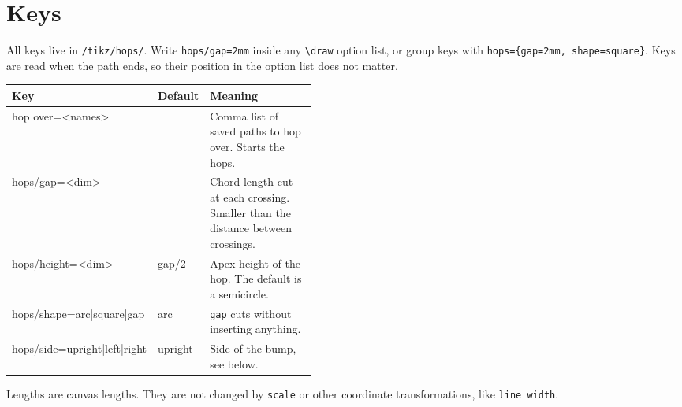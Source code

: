 \documentclass[a4paper]{article}
\newcommand\key[1]{\texttt{#1}}
\newenvironment{example}
  {\VerbatimOut{\jobname.ex}}
  {\endVerbatimOut\par\medskip\noindent
   \VerbatimInput[frame=single,fontsize=\small]{\jobname.ex}\par\smallskip
   \noindent\par\medskip}
\begin{document}
\begin{example}
\end{example}

\section{Keys}
All keys live in \texttt{/tikz/hops/}.
Write \verb|hops/gap=2mm| inside any \verb|\draw| option list, or group keys
with \verb|hops={gap=2mm, shape=square}|.
Keys are read when the path ends, so their position in the option list does not
matter.

\begin{center}
\begin{tabular}{@{}>{\ttfamily}l>{\ttfamily}l p{0.45\linewidth}@{}}
\toprule
Key & Default & Meaning\\
\midrule
hop over=<names> & & Comma list of saved paths to hop over. Starts the hops.\\
hops/gap=<dim> & 1.6mm & Chord length cut at each crossing. Smaller than the distance between crossings.\\
hops/height=<dim> & gap/2 & Apex height of the hop. The default is a semicircle.\\
hops/shape=arc|square|gap & arc & \texttt{gap} cuts without inserting anything.\\
hops/side=upright|left|right & upright & Side of the bump, see below.\\
\bottomrule
\end{tabular}
\end{center}

Lengths are canvas lengths. They are not changed by \verb|scale| or other
coordinate transformations, like \key{line width}.

\begin{example}
\end{example}
\end{document}
